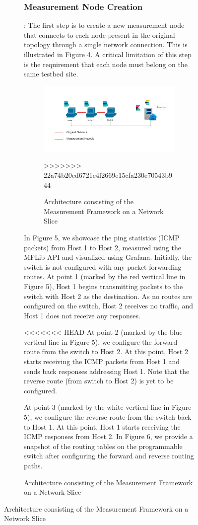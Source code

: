 \documentclass[conference]{IEEEtran}
\begin{document}
\begin{figure}[h!]
\begin{figure}[b]
    \subsubsection{Measurement Node Creation}: The first step is to create a new measurement node that connects to each node present in the original topology through a single network connection. This is illustrated in Figure 4. A critical limitation of this step is the requirement that each node must belong on the same testbed site.

    \begin{figure}[h]
        \includegraphics[scale=0.45]{Mflib.jpeg}
        \centering
        \caption{Architecture consisting of the Measurement Framework on a Network Slice}
>>>>>>> 22a74b20ed6721e4f2669e15cfa230e70543b944
    \end{figure}
    
    In Figure 5, we showcase the ping statistics (ICMP packets) from Host 1 to Host 2, measured using the MFLib API and visualized using Grafana.
    Initially, the switch is not configured with any packet forwarding routes. At point 1 (marked by the red vertical line in Figure 5), Host 1 begins transmitting packets to the switch with Host 2 as the destination. As no routes are configured on the switch, Host 2 receives no traffic, and Host 1 does not receive any responses.

<<<<<<< HEAD
    At point 2 (marked by the blue vertical line in Figure 5), we configure the forward route from the switch to Host 2. At this point, Host 2 starts receiving the ICMP packets from Host 1 and sends back responses addressing Host 1. Note that the reverse route (from switch to Host 2) is yet to be configured.

    At point 3 (marked by the white vertical line in Figure 5), we configure the reverse route from the switch back to Host 1. At this point, Host 1 starts receiving the ICMP responses from Host 2. In Figure 6, we provide a snapshot of the routing tables on the programmable switch after configuring the forward and reverse routing paths.


\end{figure}
\end{figure}
\end{document}
